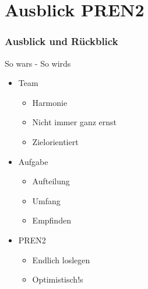 \section{Ausblick PREN2} %
\begin{frame}
    \frametitle{Ausblick und Rückblick}
	\begin{block}{So wars - So wirds}
		\begin{itemize}
			\item Team
			\begin{itemize}
				\item Harmonie
				\item Nicht immer ganz ernst
				\item Zielorientiert
			\end{itemize}
			\item Aufgabe
			\begin{itemize}
				\item Aufteilung
				\item Umfang
				\item Empfinden
			\end{itemize}
			\item PREN2
			\begin{itemize}
				\item Endlich loslegen 
				\item Optimistisch!s
			\end{itemize}
		\end{itemize}
	\end{block}
\end{frame}
